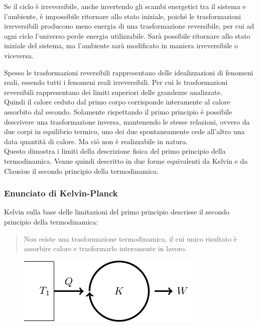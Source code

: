 \documentclass{article}
\numberwithin{equation}{subsection}
\begin{document}
Se il ciclo è irreversibile, anche invertendo gli scambi energetici tra il sistema e l'ambiente, è impossibile ritornare allo stato iniziale, poiché le trasformazioni 
irreversibili producono meno energia di una trasformazione reversibile, per cui ad ogni ciclo l'universo perde energia utilizzabile. Sarà possibile ritornare allo stato iniziale 
del sistema, ma l'ambiente sarà modificato in maniera irreversibile o viceversa. 


Spesso le trasformazioni reversibili rappresentano delle idealizzazioni di fenomeni reali, essendo tutti i fenomeni reali irreversibili. Per cui le trasformazioni reversibili 
rappresentano dei limiti superiori delle grandezze analizzate. 
\\
Quindi 
il calore ceduto dal primo corpo corrisponde interamente al 
calore assorbito dal secondo. Solamente rispettando il primo 
principio è possibile descrivere una trasformazione 
inversa, mantenendo le stesse relazioni, ovvero da due 
corpi in equilibrio termico, uno dei due spontaneamente cede 
all'altro una data quantità di calore. Ma ciò non è 
realizzabile in natura.
\\
Questo dimostra i limiti della descrizione fisica del 
primo principio della termodinamica. Venne quindi 
descritto in due forme equivalenti da Kelvin e da Clausius 
il secondo principio della termodinamica. 

\subsubsection{Enunciato di Kelvin-Planck}

Kelvin sulla base delle limitazioni del primo principio descrisse il secondo principio della termodinamica: 
\begin{quotation}
    Non esiste una trasformazione termodinamica, il cui unico 
    risultato è assorbire calore e trasformarlo interamente in 
    lavoro. 
\end{quotation}

\begin{figure}[H]%
    \centering
    \includegraphics{kelvin.pdf}%
\end{figure}
\end{document}
